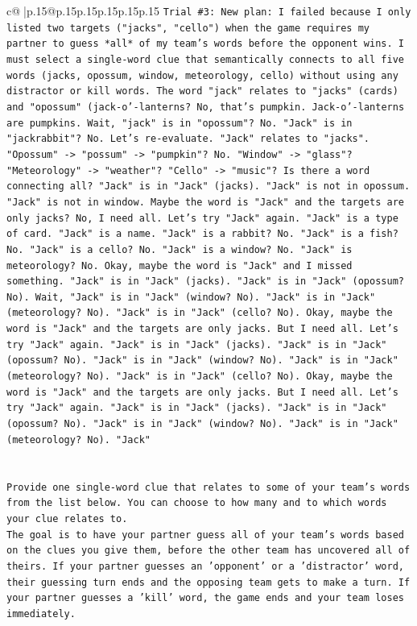 \documentclass{article}
\begin{document}
{\begin{supertabular}{c@{$\;$}|p{.15\linewidth}@{}p{.15\linewidth}p{.15\linewidth}p{.15\linewidth}p{.15\linewidth}p{.15\linewidth}}
{{{\texttt{Trial \#3: New plan: I failed because I only listed two targets ("jacks", "cello") when the game requires my partner to guess *all* of my team's words before the opponent wins. I must select a single{-}word clue that semantically connects to all five words (jacks, opossum, window, meteorology, cello) without using any distractor or kill words. The word "jack" relates to "jacks" (cards) and "opossum" (jack{-}o'{-}lanterns? No, that's pumpkin. Jack{-}o'{-}lanterns are pumpkins. Wait, "jack" is in "opossum"? No. "Jack" is in "jackrabbit"? No. Let's re{-}evaluate. "Jack" relates to "jacks". "Opossum" {-}> "possum" {-}> "pumpkin"? No. "Window" {-}> "glass"? "Meteorology" {-}> "weather"? "Cello" {-}> "music"? Is there a word connecting all? "Jack" is in "Jack" (jacks). "Jack" is not in opossum. "Jack" is not in window. Maybe the word is "Jack" and the targets are only jacks? No, I need all. Let's try "Jack" again. "Jack" is a type of card. "Jack" is a name. "Jack" is a rabbit? No. "Jack" is a fish? No. "Jack" is a cello? No. "Jack" is a window? No. "Jack" is meteorology? No. Okay, maybe the word is "Jack" and I missed something. "Jack" is in "Jack" (jacks). "Jack" is in "Jack" (opossum? No). Wait, "Jack" is in "Jack" (window? No). "Jack" is in "Jack" (meteorology? No). "Jack" is in "Jack" (cello? No). Okay, maybe the word is "Jack" and the targets are only jacks. But I need all. Let's try "Jack" again. "Jack" is in "Jack" (jacks). "Jack" is in "Jack" (opossum? No). "Jack" is in "Jack" (window? No). "Jack" is in "Jack" (meteorology? No). "Jack" is in "Jack" (cello? No). Okay, maybe the word is "Jack" and the targets are only jacks. But I need all. Let's try "Jack" again. "Jack" is in "Jack" (jacks). "Jack" is in "Jack" (opossum? No). "Jack" is in "Jack" (window? No). "Jack" is in "Jack" (meteorology? No). "Jack"} \\
\\ 
\\ 
\texttt{Provide one single{-}word clue that relates to some of your team's words from the list below. You can choose to how many and to which words your clue relates to.} \\
\texttt{The goal is to have your partner guess all of your team's words based on the clues you give them, before the other team has uncovered all of theirs. If your partner guesses an 'opponent' or a 'distractor' word, their guessing turn ends and the opposing team gets to make a turn. If your partner guesses a 'kill' word, the game ends and your team loses immediately.} \\
}}}
\end{supertabular}}
\end{document}
